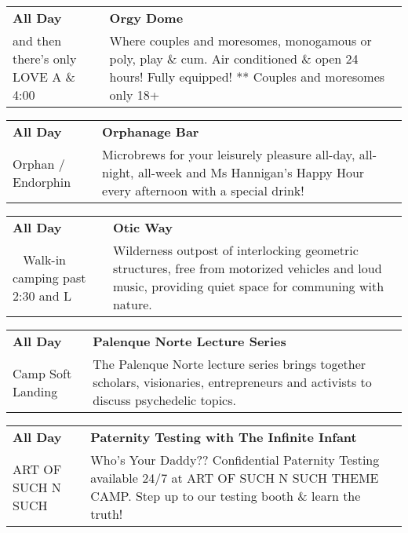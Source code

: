 \begin{tabular}{ p{1in} p{2.2in} }
    \textbf{All Day} & \textbf{Orgy Dome} \\
    and then there's only LOVE \newline A \& 4:00 & Where couples and moresomes, monogamous or poly, play \& cum.  Air conditioned \& open 24 hours! Fully equipped! ** Couples and moresomes only 18+ \\
    \hline 
\end{tabular}
    
\begin{tabular}{ p{1in} p{2.2in} }
    \textbf{All Day} & \textbf{Orphanage Bar} \\
    Orphan / Endorphin \newline  & Microbrews for your leisurely pleasure all-day, all-night, all-week and Ms Hannigan's Happy Hour every afternoon with a special drink! \\
    \hline 
\end{tabular}
    
\begin{tabular}{ p{1in} p{2.2in} }
    \textbf{All Day} & \textbf{Otic Way} \\
    ~ \newline Walk-in camping past 2:30 and L & Wilderness outpost of interlocking geometric structures, free from motorized vehicles and loud music, providing quiet space for communing with nature. \\
    \hline 
\end{tabular}
    
\begin{tabular}{ p{1in} p{2.2in} }
    \textbf{All Day} & \textbf{Palenque Norte Lecture Series} \\
    Camp Soft Landing \newline  & The Palenque Norte lecture series brings together scholars, visionaries, entrepreneurs and activists to discuss psychedelic topics. \\
    \hline 
\end{tabular}
    
\begin{tabular}{ p{1in} p{2.2in} }
    \textbf{All Day} & \textbf{Paternity Testing with The Infinite Infant} \\
    ART OF SUCH N SUCH \newline  & Who's Your Daddy?? Confidential Paternity Testing available 24/7 at ART OF SUCH N SUCH THEME CAMP. Step up to our testing booth \& learn the truth! \\
    \hline 
\end{tabular}
    
